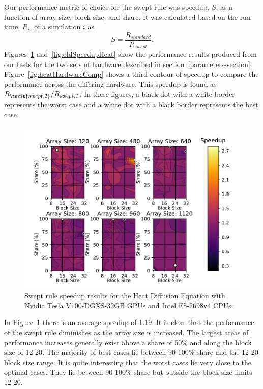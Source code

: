 \documentclass[preprints,article,accept,moreauthors,pdftex]{Definitions/mdpi}
\newcommand\fs{0.7}
\def\newCPU{Intel E5-2698v4} %
\def\newGPU{Nvidia Tesla V100-DGXS-32GB}
\begin{document}
Our performance metric of choice for the swept rule was speedup, $S$, as a function of array size, block size, and share. It was calculated based on the run time, $R_i$, of a simulation $i$ as
\begin{equation}
    S = \frac{R_{\textit{standard}}}{R_{\textit{swept}}}.
\end{equation}
Figures~\ref{fig:newSpeedupHeat} and~\ref{fig:oldSpeedupHeat} show the performance results produced from our tests for the two sets of hardware described in section~\ref{parameters-section}. 
Figure~\ref{fig:heatHardwareComp} shows a third contour of speedup to compare the performance across the differing hardware. This speedup is found as $R_{\texit{swept,2}}/R_{\textit{swept,1}}$. In these figures, a black dot with a white border represents the worst case and a white dot with a black border represents the best case.

\begin{figure}[H]
    
    \begin{center}
        \includegraphics[scale=\fs, trim={0.75cm 0.4cm 0.8cm 0.7cm},clip]{figs/speedUpheatNew.pdf}
        \caption{Swept rule speedup results for the Heat Diffusion Equation with \newGPU{} GPUs and \newCPU{} CPUs.}
        \label{fig:newSpeedupHeat}
    \end{center}
\end{figure}




In Figure~\ref{fig:newSpeedupHeat} there is an average speedup of 1.19. It is clear that the performance of the swept rule diminishes as the array size is increased. The largest areas of performance increases generally exist above a share of 50\% and along the block size of 12-20. The majority of best cases lie between 90-100\% share and the 12-20 block size range. It is quite interesting that the worst cases lie very close to the optimal cases. They lie between 90-100\% share but outside the block size limits 12-20.
\end{document}
